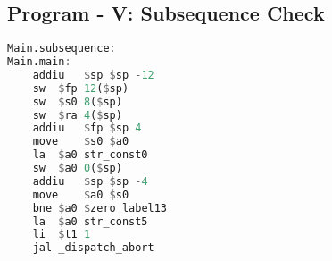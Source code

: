 \documentclass[english,a4paper,12pt]{article}
\begin{document}
\vspace{10mm}

 \subsection*{\textbf{Program - V}: Subsequence Check}

\begin{lstlisting}[language=Haskell,caption=\textit{subsequence.s}]
Main.subsequence:
Main.main:
	addiu	$sp $sp -12
	sw	$fp 12($sp)
	sw	$s0 8($sp)
	sw	$ra 4($sp)
	addiu	$fp $sp 4
	move	$s0 $a0
	la	$a0 str_const0
	sw	$a0 0($sp)
	addiu	$sp $sp -4
	move	$a0 $s0
	bne	$a0 $zero label13
	la	$a0 str_const5
	li	$t1 1
	jal	_dispatch_abort
\end{lstlisting}


\vspace{10mm}

\newpage    
\end{document}
